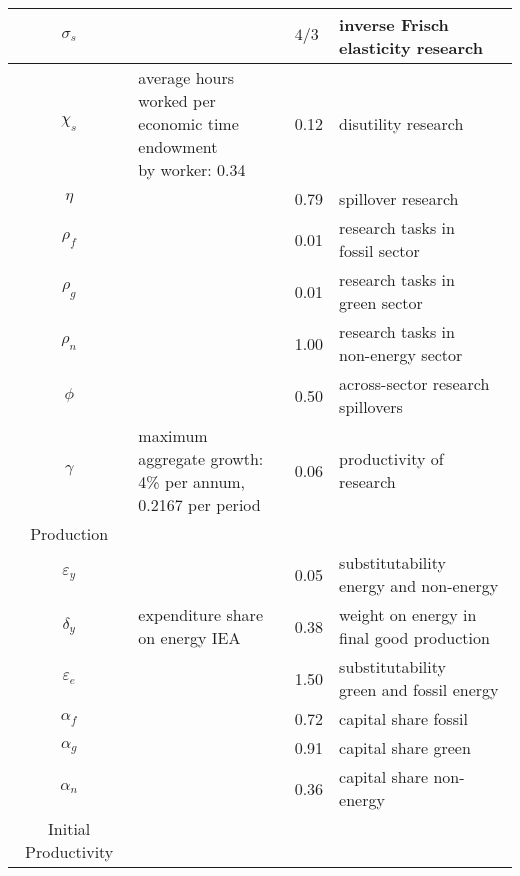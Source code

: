\begin{table}[h!]
\begin{center}
\begin{tabular}{c|lll}
 			\hline
 			$\sigma_s$ &  \makecell[l]{\cite{Chetty2011AreMargins}}& $4/3$ & inverse Frisch elasticity research \\
 			\hline
 			$\chi_s$ &\makecell[l]{average hours worked per \\ economic time endowment\\ by worker: 0.34 \cite{OECDHoursworked}} & 0.12 & disutility research\\
 			\hline
 			$\eta$ &\makecell[l]{\cite{Fried2018ClimateAnalysis}} & 0.79 & spillover research\\
 			\hline			
 			$\rho_f$ &\makecell[l]{\cite{Fried2018ClimateAnalysis}} & 0.01 &\makecell[l]{research tasks in\\ fossil sector}\\
 			\hline			
 			$\rho_g$ &\makecell[l]{\cite{Fried2018ClimateAnalysis}} & 0.01 &\makecell[l]{research tasks in\\ green sector}\\
 			\hline			
 			$\rho_n$ &\makecell[l]{\cite{Fried2018ClimateAnalysis}} & 1.00 &\makecell[l]{research tasks in \\non-energy sector}\\
 			\hline			
 			$\phi$ &\makecell[l]{\cite{Fried2018ClimateAnalysis}} & 0.50 &across-sector research spillovers\\
 			\hline
 			$\gamma$ &\makecell[l]{maximum aggregate growth:\\4\% per annum, 0.2167 per period} & 0.06 & productivity of research\\
 			\hline
 			\hline
 			Production&\multicolumn{3}{c}{}\\
 			\hline
 			
 			\hline
 			$\varepsilon_y$&\cite{Fried2018ClimateAnalysis}&0.05& \makecell[l]{substitutability \\ energy and non-energy}\\			
 			\hline
 			$\delta_y$&\makecell[l]{expenditure share \\ on energy IEA}&0.38& \makecell[l]{weight on energy in\\ final good production}\\	
 			\hline
 			$\varepsilon_e$&\cite{Fried2018ClimateAnalysis}&1.50& \makecell[l]{substitutability \\ green and fossil energy}\\	
 			\hline
 			$\alpha_f$&\cite{Fried2018ClimateAnalysis} &0.72& capital share fossil  \\
 			\hline
 			$\alpha_g$&\cite{Fried2018ClimateAnalysis} &0.91& capital share green \\
 			\hline
 			$\alpha_n$&\cite{Fried2018ClimateAnalysis} &0.36& capital share non-energy  \\
 			\hline
 			\hline
 			Initial Productivity&\multicolumn{3}{c}{}\\
 			\hline
 			

\end{tabular}
\end{center}
\end{table}

